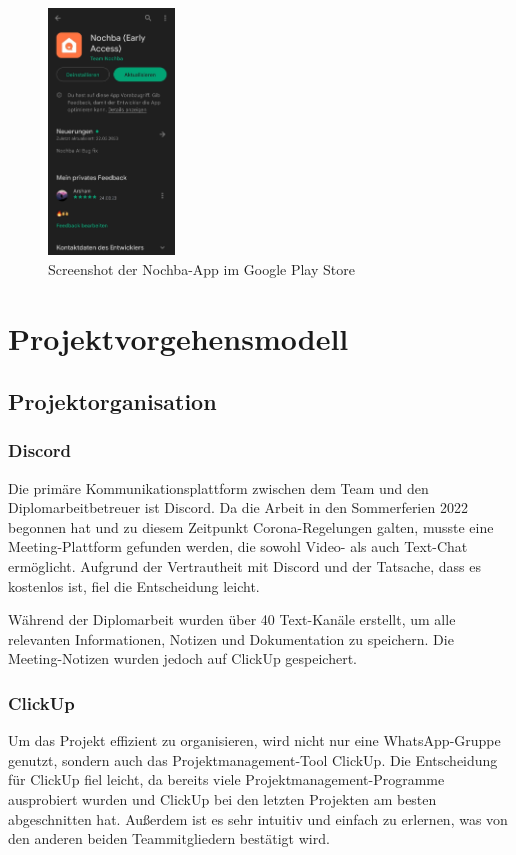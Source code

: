 \begin{figure}[H]
    \centering
    \includegraphics[width=0.3\textwidth]{pics/Nochba-Google_Play_Store.jpg}
    \caption{Screenshot der Nochba-App im Google Play Store}
    \label{fig:Nochba-GooglePlayStore}
\end{figure}

\section{Projektvorgehensmodell}
\subsection{Projektorganisation}

\subsubsection{Discord}
Die primäre Kommunikationsplattform zwischen dem Team und den Diplomarbeitbetreuer ist Discord. Da die Arbeit in den Sommerferien 2022 begonnen hat und zu diesem Zeitpunkt Corona-Regelungen galten, musste eine Meeting-Plattform gefunden werden, die sowohl Video- als auch Text-Chat ermöglicht. Aufgrund der Vertrautheit mit Discord und der Tatsache, dass es kostenlos ist, fiel die Entscheidung leicht.

Während der Diplomarbeit wurden über 40 Text-Kanäle erstellt, um alle relevanten Informationen, Notizen und Dokumentation zu speichern. Die Meeting-Notizen wurden jedoch auf ClickUp gespeichert.
\subsubsection{ClickUp}
Um das Projekt effizient zu organisieren, wird nicht nur
eine WhatsApp-Gruppe genutzt, sondern auch das
Projektmanagement-Tool ClickUp. Die Entscheidung für ClickUp
fiel leicht, da bereits viele Projektmanagement-Programme
ausprobiert wurden und ClickUp bei den letzten Projekten am
besten abgeschnitten hat. Außerdem ist es sehr intuitiv und
einfach zu erlernen, was von den anderen beiden Teammitgliedern
bestätigt wird.

